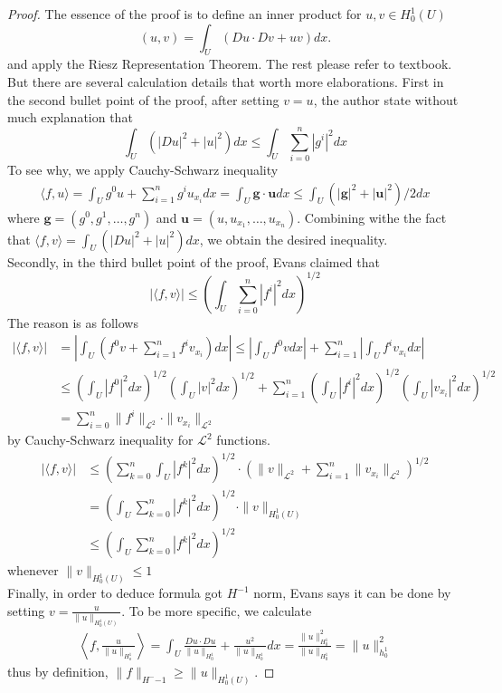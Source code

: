 \documentclass{article}
\begin{document}
\begin{proof}
    The essence of the proof is to define an inner product for $u,v\in H_0^1(U)$
    $$
        (u, v)=\int_{U}(Du\cdot Dv+uv)dx.
    $$ and apply the Riesz Representation Theorem. The rest please refer to textbook. \\
    \indent But there are several calculation details that worth more elaborations. First in the second bullet point of the proof, after setting $v=u$, the author state without much explanation that 
    $$
        \int_{U}(|Du|^2+|u|^2)dx\leq \int_{U}\sum\limits_{i=0}^n|g^i|^2dx
    $$
    To see why, we apply Cauchy-Schwarz inequality
    \begin{align*}
        \langle f,u\rangle =\int_U g^0u + \sum\limits_{i=1}^ng^iu_{x_i}dx=\int_U\textbf{g}\cdot\textbf{u}dx\leq\int_U (|\textbf{g}|^2+|\textbf{u}|^2)/2dx
    \end{align*}
    where $\textbf{g}=(g^0, g^1, \dots, g^n)$ and $\textbf{u}=(u, u_{x_1}, \dots, u_{x_n})$. Combining withe the fact that $\langle f,v\rangle=\int_{U}(|Du|^2+|u|^2)dx$, we obtain the desired inequality. \\
    \indent Secondly, in the third bullet point of the proof, Evans claimed that 
    $$
    \left|\langle f, v\rangle\right|\leq \left(\int_U\sum\limits_{i=0}^n|f^i|^2dx\right)^{1/2}
    $$
    The reason is as follows
    \begin{align*}
        \left|\langle f, v\rangle\right|&=\left|\int_U\left(f^0v+\sum\limits_{i=1}^{n}f^iv_{x_i}\right)dx\right|\leq \left|\int_Uf^0vdx\right|+\sum\limits_{i=1}^{n}\left|\int_{U}f^iv_{x_i}dx\right| \\
        &\leq \left(\int_U|f^0|^2dx\right)^{1/2}\left(\int_U|v|^2dx\right)^{1/2}+\sum\limits_{i=1}^{n}\left(\int_U|f^i|^2dx\right)^{1/2}\left(\int_U|v_{x_i}|^2dx\right)^{1/2} \\
        &= \sum\limits_{i=0}^{n}\|f^i\|_{\mathscr{L}^2}\cdot\|v_{x_i}\|_{\mathscr{L}^2}
    \end{align*}
    by Cauchy-Schwarz inequality for $\mathscr{L}^2$ functions.
    \begin{align*}
        \left|\langle f, v\rangle\right| &\leq \left(\sum\limits_{k=0}^n\int_U|f^k|^2dx\right)^{1/2}\cdot\left(\|v\|_{\mathscr{L}^2}+\sum\limits_{i=1}^n\|v_{x_i}\|_{\mathscr{L}^2}\right)^{1/2} \\
        &= \left(\int_{U}\sum\limits_{k=0}^n|f^k|^2dx\right)^{1/2}\cdot \|v\|_{H_0^1(U)} \\
        &\leq \left(\int_{U}\sum\limits_{k=0}^n|f^k|^2dx\right)^{1/2}
    \end{align*} whenever $\|v\|_{H_0^1(U)}\leq 1$ \\
    \indent Finally, in order to deduce formula got $H^{-1}$ norm, Evans says it can be done by setting $v=\frac{u}{\|u\|_{H_0^1(U)}}$. To be more specific, we calculate
    \begin{align*}
        \left\langle f,\frac{u}{\|u\|_{H_o^1}}\right\rangle=\int_U \frac{Du\cdot Du}{\|u\|_{H_0^1}}+\frac{u^2}{\|u\|_{H_0^1}}dx=\frac{\|u\|^2_{H_0^1}}{\|u\|_{H_0^1}}=\|u\|^2_{h_0^1}
    \end{align*} thus by definition, $\|f\|_{H^-{-1}}\geq \|u\|_{H^1_0(U)}$.
\end{proof}
\end{document}
